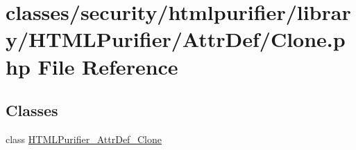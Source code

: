 \hypertarget{Clone_8php}{\section{classes/security/htmlpurifier/library/\+H\+T\+M\+L\+Purifier/\+Attr\+Def/\+Clone.php File Reference}
\label{Clone_8php}
}
\subsection*{Classes}
\begin{DoxyCompactItemize}
\item 
class \hyperlink{classHTMLPurifier__AttrDef__Clone}{H\+T\+M\+L\+Purifier\+\_\+\+Attr\+Def\+\_\+\+Clone}
\end{DoxyCompactItemize}
